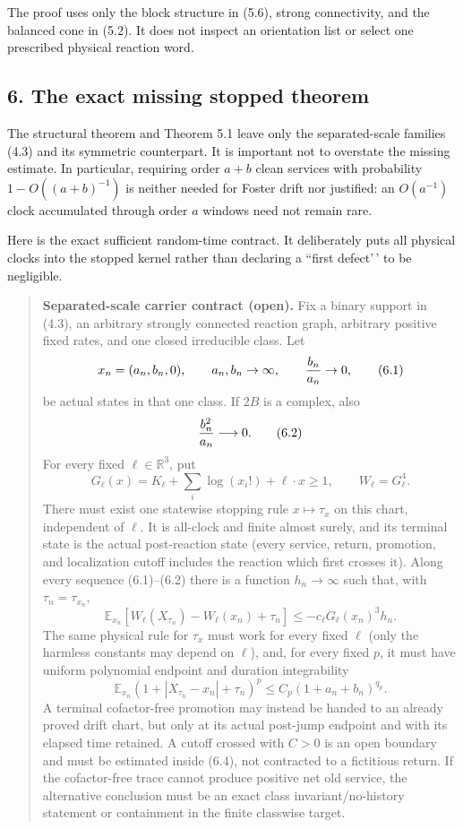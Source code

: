 The proof uses only the block structure in (5.6), strong connectivity,
and the balanced cone in (5.2). It does not inspect an orientation list
or select one prescribed physical reaction word.

\subsection{6. The exact missing stopped
theorem}

The structural theorem and Theorem 5.1 leave only the separated-scale
families (4.3) and its symmetric counterpart. It is important not to
overstate the missing estimate. In particular, requiring order \(a+b\)
clean services with probability \(1-O((a+b)^{-1})\) is neither needed
for Foster drift nor justified: an \(O(a^{-1})\) clock accumulated
through order \(a\) windows need not remain rare.

Here is the exact sufficient random-time contract. It deliberately puts
all physical clocks into the stopped kernel rather than declaring a
``first defect'\,' to be negligible.

\begin{quote}
\textbf{Separated-scale carrier contract (open).} Fix a binary support
in (4.3), an arbitrary strongly connected reaction graph, arbitrary
positive fixed rates, and one closed irreducible class. Let \[
x_n=(a_n,b_n,0),\qquad a_n,b_n\to\infty,\qquad
{b_n\over a_n}\to0,                                         \tag{6.1}
\] be actual states in that one class. If \(2B\) is a complex, also \[
                        {b_n^2\over a_n}\longrightarrow0.   \tag{6.2}
\] For every fixed \(\ell\in\mathbb R^3\), put \[
G_\ell(x)=K_\ell+\sum_i\log(x_i!)+\ell\cdot x\ge1,
\qquad W_\ell=G_\ell^4.                                    \tag{6.3}
\] There must exist one statewise stopping rule \(x\mapsto\tau_x\) on
this chart, independent of \(\ell\). It is all-clock and finite almost
surely, and its terminal state is the actual post-reaction state (every
service, return, promotion, and localization cutoff includes the
reaction which first crosses it). Along every sequence (6.1)--(6.2)
there is a function \(h_n\to\infty\) such that, with
\(\tau_n=\tau_{x_n}\), \[
\mathbb E_{x_n}
  [W_\ell(X_{\tau_n})-W_\ell(x_n)+\tau_n]
      \le-c_\ell G_\ell(x_n)^3h_n .                          \tag{6.4}
\] The same physical rule for \(\tau_x\) must work for every fixed
\(\ell\) (only the harmless constants may depend on \(\ell\)), and, for
every fixed \(p\), it must have uniform polynomial endpoint and duration
integrability \[
\mathbb E_{x_n}
  (1+|X_{\tau_n}-x_n|+\tau_n)^p
      \le C_p(1+a_n+b_n)^{q_p}.                              \tag{6.5}
\] A terminal cofactor-free promotion may instead be handed to an
already proved drift chart, but only at its actual post-jump endpoint
and with its elapsed time retained. A cutoff crossed with \(C>0\) is an
open boundary and must be estimated inside (6.4), not contracted to a
fictitious return. If the cofactor-free trace cannot produce positive
net old service, the alternative conclusion must be an exact class
invariant/no-history statement or containment in the finite classwise
target.
\end{quote}


